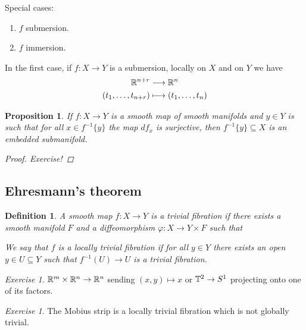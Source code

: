 \documentclass[A4paper, british, reqno]{amsart}
\theoremstyle{darkgreentheorem}
\newtheorem{prop}[thm]{Proposition}
\theoremstyle{darkbluedefinition}
\newtheorem{defn}[thm]{Definition}
\theoremstyle{darkredexample}
\theoremstyle{remark}
\newtheorem{exe}[thm]{Exercise}
\newcommand{\1}{\mathbbm{1}}
\newcommand{\tms}{\times}
\newcommand{\sub}{\subseteq}
\begin{document}
Special cases:
\begin{enumerate}
    \item $f$ submersion.
    \item $f$ immersion.
\end{enumerate}

In the first case, if $f\colon X\to Y$ is a submersion, locally on $X$ and on $Y$ we have
\begin{align*}
    \mathbb{R}^{n+r} &\longrightarrow \mathbb{R}^{n} \\
    (t_{1},\ldots,t_{n+r})&\longmapsto (t_{1},\ldots,t_{n})
\end{align*}

\begin{prop}
    If $f\colon X\to Y$ is a smooth map of smooth manifolds and $y\in Y$ is such that for all $x\in f^{-1}\{y\}$ the map $df_{x}$ is surjective, then $f^{-1}\{y\}\sub X$ is an embedded submanifold.
    \begin{proof}
	Exercise!
    \end{proof}
\end{prop}

\subsection{Ehresmann's theorem}

\begin{defn}
    A smooth map $f\colon X\to Y$ is a \textit{trivial fibration} if there exists a smooth manifold $F$ and a diffeomorphism $\varphi\colon X\to Y\tms F$ such that
    \begin{center}
    \end{center}
    We say that $f$ is a \textit{locally trivial fibration} if for all $y\in Y$ there exists an open $y\in U\sub Y$ such that $f^{-1}(U)\to U$ is a trivial fibration.
\end{defn}

\begin{exe}
    $\R^{m}\tms \R^{n}\to \R^{n}$ sending $(x,y)\mapsto x$ or $\mathbb{T}^{2}\to S^{1}$ projecting onto one of its factors.
\end{exe}

\begin{exe}
    The Mobius strip is a locally trivial fibration which is not globally trivial.
\end{exe}
\end{document}
